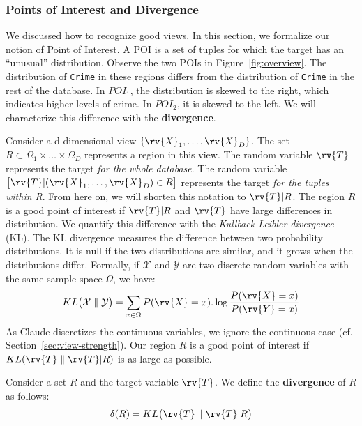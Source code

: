 \subsubsection{Points of Interest and Divergence}

We discussed how to recognize good views. In this section, we formalize our
notion of Point of Interest. A POI is a set of tuples for which the target has
an ``unusual'' distribution. Observe the two POIs in Figure~\ref{fig:overview}.
The distribution of \texttt{Crime} in these regions differs from the
distribution of \texttt{Crime} in the rest of the database.  In $POI_1$, the
distribution is skewed to the right, which indicates higher levels of crime. In
$POI_2$, it is skewed to the left. We will characterize this difference with the
\textbf{divergence}.

Consider a d-dimensional view $\{\rv{X}_1, \ldots, \rv{X}_D\}$. The set
$R\subset \Omega_1 \times \ldots \times \Omega_D$ represents a region in this
view.  The random variable $\rv{T}$ represents the target \emph{for the whole
database}.  The random variable $\big[ \rv{T} | (\rv{X}_1, \ldots, \rv{X}_D) \in R
\big] $ represents the target \emph{for the tuples within R}. From here on, we
will shorten this notation to $\rv{T} | R$. The region $R$ is a good point
of interest if $\rv{T} |R $ and $\rv{T}$ have large differences in
distribution.  We quantify this difference with the \emph{Kullback-Leibler
divergence} (KL).  The KL divergence measures the difference between two
probability distributions. It is null if the two distributions are similar, and
it grows when the distributions differ.  Formally, if $\mathcal{X}$ and
$\mathcal{Y}$ are two discrete random variables with the same sample space
$\Omega$, we have:
\begin{equation}\label{eq:KL_disc} 
    KL\big( \mathcal{X} \parallel \mathcal{Y} \big) = 
    \sum_{x\in \Omega} P(\rv{X} = x).\log{\frac{P(\rv{X} = x)}{P(\rv{Y} = x)}} 
\end{equation}
As Claude discretizes the continuous variables, we ignore the continuous case
(cf.  Section~\ref{sec:view-strength}). Our region $R$ is a good point of
interest if $KL ( \rv{T} \parallel \rv{T} |R )$ is as large as possible.
\begin{definition}
    Consider a set $R$ and the target variable $\rv{T}$. We define the
    \textbf{divergence} of $R$ as follows: 
\begin{equation}\label{eq:divergence}
    \delta(R) = KL \big( \rv{T} \parallel \rv{T} |R \big)
\end{equation}
\end{definition}

